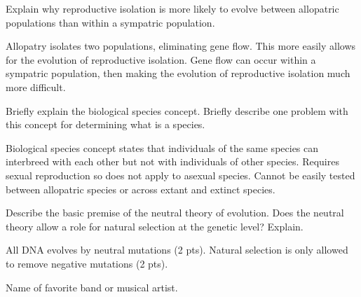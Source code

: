 \documentclass[12pt, addpoints]{exam}
\newcommand*\AnswerBox[2]{%
	\parbox[t][#1]{0.92\textwidth}{%
		\begin{solution}#2\end{solution}}
	\vspace{\stretch{1}}
}
\begin{document}
\begin{questions}
\question[5]
Explain why reproductive isolation is more likely to evolve between allopatric populations than within a sympatric population.

\AnswerBox{0.2\textheight}{%
	Allopatry isolates two populations, eliminating gene flow. This more easily allows for the evolution of reproductive isolation.  Gene flow can occur within a sympatric population, then making the evolution of reproductive isolation much more difficult.
}

\question[5]
Briefly explain the biological species concept. Briefly describe one problem with this concept for determining what is a species.

\AnswerBox{0.2\textheight}{%
Biological species concept states that individuals of the same species can interbreed with each other but not with individuals of other species. Requires sexual reproduction so does not apply to asexual species. Cannot be easily tested between allopatric species or across extant and extinct species.
}

%


\question[4]
Describe the basic premise of the neutral theory of evolution. Does the neutral theory allow a role for natural selection at the genetic level? Explain.

\AnswerBox{0.1\textheight}{%
	All DNA evolves by neutral mutations (2 pts). Natural selection is only allowed to remove negative mutations (2 pts).
}

\vfill

\bonusquestion[2]
Name of favorite band or musical artist.


\newpage

\question[10]


\end{questions}
\end{document}
